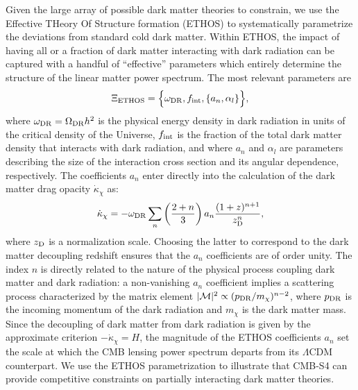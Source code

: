 Given the large array of possible dark matter theories to constrain, we use the Effective THeory Of Structure formation (ETHOS) \cite{Cyr-Racine:2015ihg} to systematically parametrize the deviations from standard cold dark matter. Within ETHOS, the impact of having all or a fraction of dark matter interacting with dark radiation can be captured with a handful of ``effective'' parameters which entirely determine the structure of the linear matter power spectrum. The most relevant parameters are \cite{Cyr-Racine:2015ihg}
%
\begin{equation}
\Xi_{\rm ETHOS} = \Big\{\omega_{\rm DR},f_{\rm int}, \{a_n,\alpha_l\} \Big\},
\end{equation}
%
where $\omega_{\rm DR} = \Omega_{\rm DR}h^2$ is the physical energy density in dark radiation in units of the critical density of the Universe, $f_{\rm int}$ is the fraction of the total dark matter density that interacts with dark radiation, and where $a_n$ and $\alpha_l$ are parameters describing the size of the interaction cross section and its angular dependence, respectively. The coefficients $a_n$ enter directly into the calculation of the dark matter drag opacity $\dot{\kappa}_\chi$ as:
%
\begin{equation}
\dot{\kappa}_\chi =- \omega_{\rm DR} \sum_n \left(\frac{2+n}{3}\right)a_n \frac{(1+z)^{n+1}}{z_{\rm D}^n},
\end{equation}
%
where $z_{\rm D}$ is a normalization scale. Choosing the latter to correspond to the dark matter decoupling redshift ensures that the $a_n$ coefficients are of order unity. The index $n$ is directly related to the nature of the physical process coupling dark matter and dark radiation: a non-vanishing $a_n$ coefficient implies a scattering process characterized by the matrix element $|\mathcal{M}|^2 \propto (p_{\rm DR}/m_\chi)^{n-2}$, where $p_{\rm DR}$ is the incoming momentum of the dark radiation and $m_\chi$ is the dark matter mass. Since the decoupling of dark matter from dark radiation is given by the approximate criterion $-\dot{\kappa}_\chi = H$, the magnitude of the ETHOS coefficients $a_n$ set the scale at which the CMB lensing power spectrum departs from its $\Lambda$CDM counterpart.  We use the ETHOS parametrization to illustrate that CMB-S4 can provide competitive constraints on partially interacting dark matter theories.

